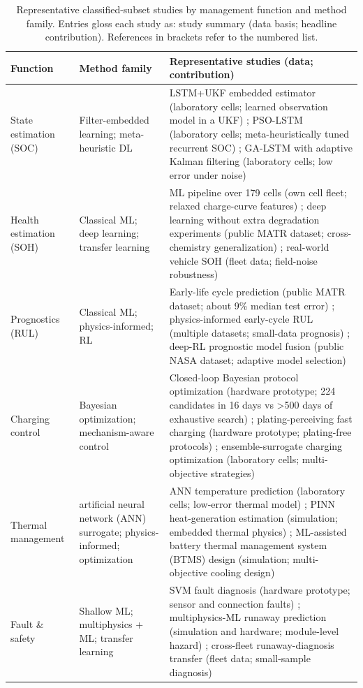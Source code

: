 \documentclass[journal]{IEEEtran}
\begin{document}
\begin{table}[!t]
\caption{Representative classified-subset studies by management function and method family. Entries gloss each study as: study summary (data basis; headline contribution). References in brackets refer to the numbered list.}
\label{tab:TABLE_REP}
\centering
\footnotesize
\begin{tabular}{|p{0.87in}|p{2.75in}|p{3.02in}|}
\hline
\textbf{Function} & \textbf{Method family} & \textbf{Representative studies (data; contribution)} \\
\hline
State estimation (SOC) & Filter-embedded learning; meta-heuristic DL & LSTM+UKF embedded estimator (laboratory cells; learned observation model in a UKF) \cite{r5}; PSO-LSTM (laboratory cells; meta-heuristically tuned recurrent SOC) \cite{r33}; GA-LSTM with adaptive Kalman filtering (laboratory cells; low error under noise) \cite{r42} \\
Health estimation (SOH) & Classical ML; deep learning; transfer learning & ML pipeline over 179 cells (own cell fleet; relaxed charge-curve features) \cite{r50}; deep learning without extra degradation experiments (public MATR dataset; cross-chemistry generalization) \cite{r54}; real-world vehicle SOH (fleet data; field-noise robustness) \cite{r6} \\
Prognostics (RUL) & Classical ML; physics-informed; RL & Early-life cycle prediction (public MATR dataset; about 9\% median test error) \cite{r3}; physics-informed early-cycle RUL (multiple datasets; small-data prognosis) \cite{r63}; deep-RL prognostic model fusion (public NASA dataset; adaptive model selection) \cite{r13} \\
Charging control & Bayesian optimization; mechanism-aware control & Closed-loop Bayesian protocol optimization (hardware prototype; 224 candidates in 16 days vs >500 days of exhaustive search) \cite{r4}; plating-perceiving fast charging (hardware prototype; plating-free protocols) \cite{r70}; ensemble-surrogate charging optimization (laboratory cells; multi-objective strategies) \cite{r71} \\
Thermal management & artificial neural network (ANN) surrogate; physics-informed; optimization & ANN temperature prediction (laboratory cells; low-error thermal model) \cite{r72}; PINN heat-generation estimation (simulation; embedded thermal physics) \cite{r9}; ML-assisted battery thermal management system (BTMS) design (simulation; multi-objective cooling design) \cite{r73} \\
Fault \& safety & Shallow ML; multiphysics + ML; transfer learning & SVM fault diagnosis (hardware prototype; sensor and connection faults) \cite{r74}; multiphysics-ML runaway prediction (simulation and hardware; module-level hazard) \cite{r75}; cross-fleet runaway-diagnosis transfer (fleet data; small-sample diagnosis) \cite{r76} \\

\end{tabular}
\end{table}
\end{document}
